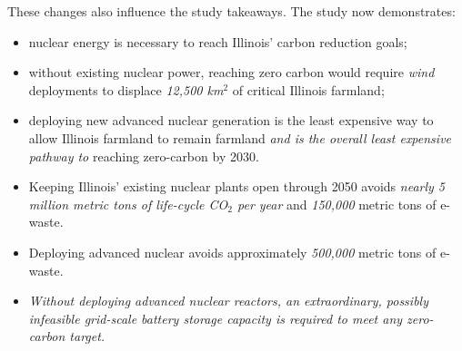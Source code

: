 These changes also influence the study takeaways. The study now demonstrates:
\begin{itemize}
  \item nuclear energy is necessary to reach Illinois' carbon reduction goals;
  \item without existing nuclear power, reaching zero carbon would require
  \textit{wind} deployments to displace \textit{12,500 km$^2$} of critical Illinois
  farmland;
  \item deploying new advanced nuclear generation is the least expensive way to allow
  Illinois farmland to remain farmland \textit{and is the overall least expensive
  pathway to } reaching zero-carbon by 2030.
  \item Keeping Illinois' existing nuclear plants open through 2050 avoids
  \textit{nearly 5 million metric tons of life-cycle CO$_2$ per year} and
  \textit{150,000} metric tons of e-waste.
  \item Deploying advanced nuclear avoids approximately \textit{500,000} metric
  tons of e-waste.
  \item \textit{Without deploying advanced nuclear reactors, an extraordinary,
  possibly infeasible grid-scale battery storage capacity is required to meet
  any zero-carbon target.}
\end{itemize}
